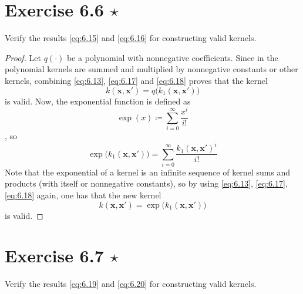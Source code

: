 \section*{Exercise 6.6 $\star$}
Verify the results \eqref{eq:6.15} and \eqref{eq:6.16} for constructing valid kernels.

\vspace{1em}

\begin{proof}
    Let $q(\cdot)$ be a polynomial with nonnegative coefficients. Since in the polynomial
    kernels are summed and multiplied by nonnegative constants or other kernels, combining
    \eqref{eq:6.13}, \eqref{eq:6.17} and \eqref{eq:6.18} proves that
    the kernel
    \begin{equation}\label{eq:6.15}\tag{6.15}
        k(\mathbf{x}, \mathbf{x}') = q\big(k_1(\mathbf{x}, \mathbf{x}')\big)
    \end{equation}
    is valid. Now, the exponential function is defined as
    \[
        \exp(x) \coloneqq \sum_{i=0}^{\infty} \frac{x^i}{i!} 
    \],
    so
    \[
        \exp\big(k_1(\mathbf{x}, \mathbf{x}')\big)
        = \sum_{i=0}^{\infty} \frac{k_1(\mathbf{x}, \mathbf{x}')^i}{i!}
    \] 
    Note that the exponential of a kernel is an infinite sequence of kernel sums
    and products (with itself or nonnegative constants), so by using
    \eqref{eq:6.13}, \eqref{eq:6.17}, \eqref{eq:6.18} again, one has that
    the new kernel
    \begin{equation}\label{eq:6.16}\tag{6.16}
        k(\mathbf{x}, \mathbf{x}') = \exp\big(k_1(\mathbf{x}, \mathbf{x}')\big)
    \end{equation}
    is valid.
\end{proof}

\section*{Exercise 6.7 $\star$}
Verify the results \eqref{eq:6.19} and \eqref{eq:6.20} for constructing valid kernels.

\vspace{1em}

